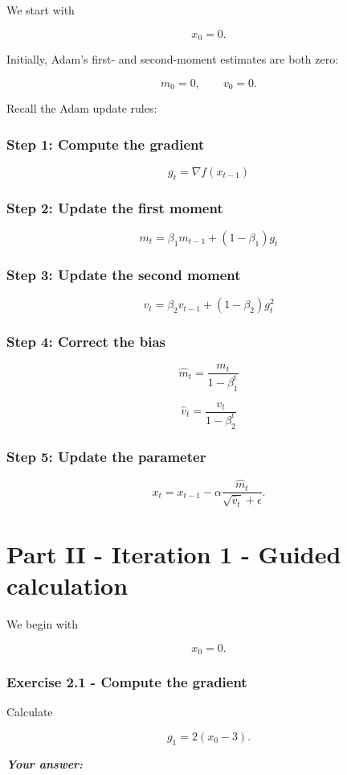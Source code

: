 \documentclass[10pt]{article}
\begin{document}
We start with

\[
x_0 = 0.
\]

Initially, Adam's first- and second-moment estimates are both zero:

\[
m_0 = 0,
\qquad
v_0 = 0.
\]

Recall the Adam update rules:

\subsubsection*{Step 1: Compute the gradient}
\[
g_t = \nabla f(x_{t-1})
\]

\subsubsection*{Step 2: Update the first moment}
\[
m_t = \beta_1m_{t-1} + (1-\beta_1)g_t
\]

\subsubsection*{Step 3: Update the second moment}
\[
v_t = \beta_2v_{t-1} + (1-\beta_2)g_t^2
\]

\subsubsection*{Step 4: Correct the bias}
\[
\hat m_t = \frac{m_t}{1-\beta_1^t}
\]

\[
\hat v_t = \frac{v_t}{1-\beta_2^t}
\]

\subsubsection*{Step 5: Update the parameter}
\[
x_t =
x_{t-1}
-
\alpha
\frac{\hat m_t}
{\sqrt{\hat v_t}+\epsilon}.
\]

\clearpage
\section*{Part II - Iteration 1 - Guided calculation}
We begin with

\[
x_0=0.
\]

\subsubsection*{Exercise 2.1 - Compute the gradient}
Calculate

\[
g_1 = 2(x_0-3).
\]

\textbf{\textit{Your answer:}}
\end{document}
